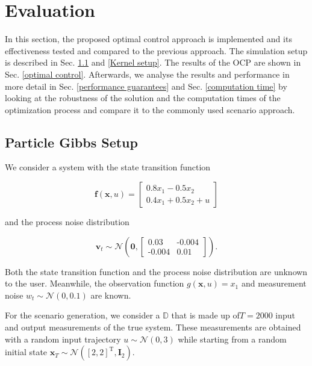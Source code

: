 \chapter{Evaluation}

In this section, the proposed optimal control approach is implemented and its effectiveness tested and compared to the previous approach. The simulation setup is described in Sec. \ref{PG setup} and \ref{Kernel setup}. The results of the OCP are shown in Sec. \ref{optimal control}. Afterwards, we analyse the results and performance in more detail in Sec. \ref{performance guarantees} and Sec. \ref{computation time} by looking at the robustness of the solution and the computation times of the optimization process and compare it to the commonly used scenario approach.

\section{Particle Gibbs Setup} \label{PG setup}

We consider a system with the state transition function

\begin{equation}
\boldsymbol{f}(\boldsymbol{x}, u) = 
\begin{bmatrix}
0.8  x_1 - 0.5 x_2 \\
0.4 x_1 + 0.5 x_2 + u
\end{bmatrix}
\end{equation}

and the process noise distribution

\begin{equation}
\boldsymbol{v}_t \sim \mathcal{N} \left(\boldsymbol{0}, 
\begin{bmatrix}
0.03 & \text{-}0.004 \\
\text{-}0.004 & 0.01
\end{bmatrix}
\right).
\end{equation}

Both the state transition function and the process noise distribution are unknown to the user. Meanwhile, the observation function $g(\boldsymbol{x}, u) = x_1$ and measurement noise $w_t \sim \mathcal{N} (0, 0.1)$ are known. 


For the scenario generation, we consider a $\mathbb{D}$ that is made up of$T = 2000$ input and output measurements of the true system. These measurements are obtained with a random input trajectory $u \sim \mathcal{N} (0, 3)$ while starting from a random initial state $\boldsymbol{x}_T \sim \mathcal{N} ([2, 2]^\text{T}, \boldsymbol{I}_2)$.



